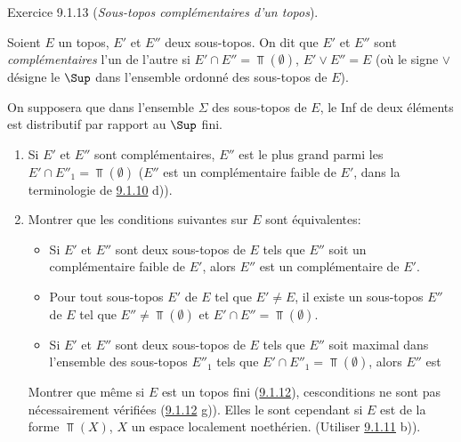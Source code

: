 \documentclass[10pt]{../fichiers-configuration-latex/smfart}
\begin{document}
\begin{enonce*}[remark]{Exercice 9.1.13}
(\emph{Sous-topos complémentaires d'un topos}).

Soient $E$ un topos, $E'$ et $E''$ deux sous-topos. On dit que $E'$
et $E''$ sont \emph{complémentaires} l'un de l'autre si $E'\cap
E''=\Top(∅)$, $E'\vee E''=E$ (où le signe $\vee$ désigne le
$\Sup$ dans l'ensemble ordonné des sous-topos de $E$).

On supposera que dans l'ensemble $\Sigma$ des sous-topos de $E$, le
Inf de deux éléments est distributif par rapport au $\Sup$ fini.

\begin{enumerate}
\renewcommand{\theenumi}{\alph{enumi}}
\renewcommand{\labelenumi}{\theenumi)}
\item Si $E'$ et $E''$ sont complémentaires, $E''$ est le plus grand
parmi les  $E'\cap E''_1=\Top(∅)$
(\ie $E''$ est un complémentaire faible de $E'$, dans la
terminologie de \hyperref[IV.exer9.1.10]{9.1.10} d)).

\item Montrer que les conditions suivantes sur $E$ sont équivalentes:
\begin{itemize}
\item[(i)] Si $E'$ et $E''$ sont deux sous-topos de $E$ tels que $E''$
soit un complémentaire faible de $E'$, alors $E''$ est un
complémentaire de $E'$.

\item[(ii)] Pour tout sous-topos $E'$ de $E$ tel que $E'\neq E$, il
existe un sous-topos $E''$ de $E$ tel que $E''\neq \Top(∅)$ et
$E'\cap E''=\Top(∅)$.

\item[(i bis)] Si $E'$ et $E''$ sont deux sous-topos de $E$ tels que
$E''$ soit maximal dans l'ensemble des sous-topos $E''_1$ tels que
$E'\cap E''_1=\Top(∅)$, alors $E''$ est 
\end{itemize}

Montrer que même si $E$ est un topos fini (\hyperref[IV.exer9.1.12]{9.1.12}),
ces\pageoriginale conditions ne sont pas nécessairement vérifiées
(\hyperref[IV.exer9.1.12]{9.1.12} g)). Elles le sont cependant si $E$ est de la
forme $\Top(X)$, $X$ un espace localement noethérien. (Utiliser
\hyperref[IV.exer9.1.11]{9.1.11} b)).


\end{enumerate}
\end{enonce*}
\end{document}
